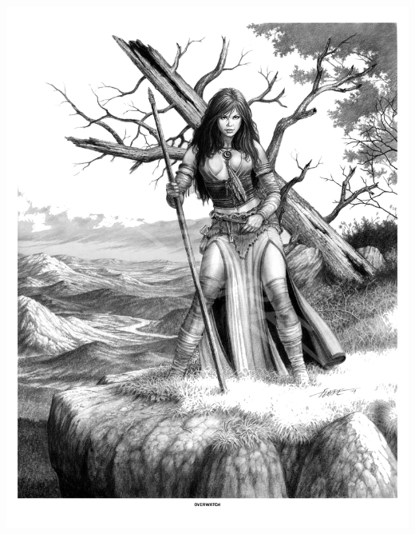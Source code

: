 \begin{multicols*}{2}
\begin{Figure}
\centering
\includegraphics[width=\textwidth]{img/druid-2.png}
\end{Figure}
    
\end{multicols*}


\clearpage

